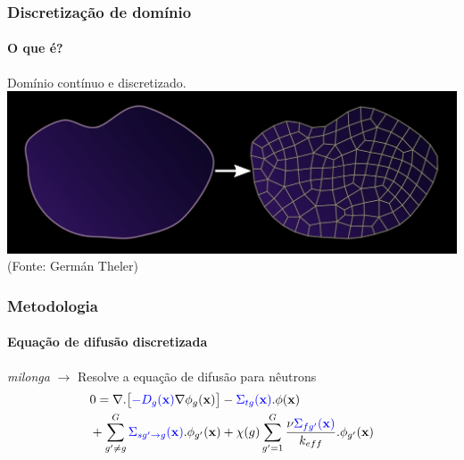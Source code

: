 \documentclass[svgnames,smaller,table]{beamer}
\begin{document}
{
  
\begin{frame}
  \frametitle{Discretização de domínio}
  \framesubtitle{O que é?}
\centering
Domínio contínuo e discretizado.
\\
\vspace{0.5cm}
  \centering
  \includegraphics[scale=1.1]{../figuras/dom-neg.png}
  \vspace{0.5cm}
  \scriptsize(Fonte: Germán Theler)
\end{frame}
}
\begin{frame}
  \frametitle{Metodologia}
  \framesubtitle{Equação de difusão discretizada}
  \textit{milonga} $\rightarrow$ Resolve a equação de difusão para nêutrons
  \\
  \vspace{0.5cm}
\begin{equation*}
  \label{eq:difusao}
  \begin{split}
  & 0 = \nabla . \big[\textcolor{blue}{-D_g({\mathbf{x}})} \nabla \phi_g(\mathbf{x})\big] 
- \textcolor{blue}{\Sigma_{tg}(\mathbf{x})}.\phi(\mathbf{x}) \\
& + \sum_{g'\neq g}^{G} \textcolor{blue}{\Sigma_{sg'\rightarrow g}(\mathbf{x})} . \phi_{g'}(\mathbf{x})
+ \chi(g)  \sum_{g'=1}^{G} \frac{\nu \textcolor{blue}{\Sigma_{fg'}(\mathbf{x})}}{k_{eff}} . \phi_{g'}(\mathbf{x}) \\
  \end{split}
  \end{equation*}
  
\end{frame}
\end{document}
